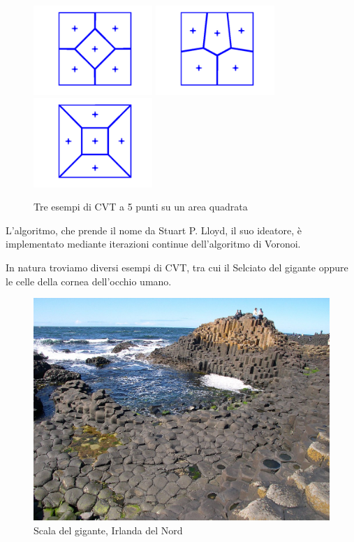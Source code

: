 \documentclass[11pt,a4paper]{report}
\begin{document}
\begin{figure}[H]
\centering
\includegraphics[width=4.5cm]{cvt1.png}
\includegraphics[width=4.5cm]{cvt2.png}
\includegraphics[width=4.5cm]{cvt3.png}
\caption{Tre esempi di CVT a 5 punti su un area quadrata}
\end{figure}

L'algoritmo, che prende il nome da Stuart P. Lloyd, il suo ideatore, è implementato mediante iterazioni continue dell'algoritmo di Voronoi.

In natura troviamo diversi esempi di CVT, tra cui il Selciato del gigante oppure le celle della cornea dell'occhio umano.

\begin{figure}[H]
\centering
\includegraphics[width=14cm]{selciato_del_gigante.jpg}
\caption{Scala del gigante, Irlanda del Nord}
\end{figure}
\end{document}
